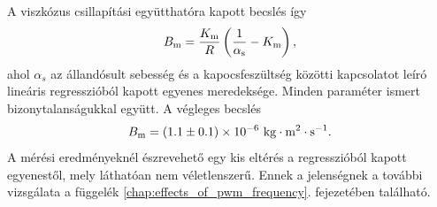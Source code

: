 A viszkózus csillapítási együtthatóra kapott becslés így
\begin{equation}
    B_{\mathrm{m}} = \frac{K_{\mathrm{m}}}{R}\left(\frac{1}{\alpha_{\mathrm{s}}} - K_{\mathrm{m}}\right),
\end{equation}
ahol \(\alpha_s\) az állandósult sebesség és a kapocsfeszültség közötti kapcsolatot 
leíró lineáris regresszióból kapott egyenes meredeksége. Minden paraméter ismert bizonytalanságukkal 
együtt. A végleges becslés
\begin{equation}
    B_{\mathrm{m}} = (1.1 \pm 0.1)\times 10^{-6}~\mathrm{kg\cdot m^2\cdot s^{-1}}.
\end{equation}
A mérési eredményeknél észrevehető egy kis eltérés a regresszióból kapott egyenestől, mely láthatóan nem 
véletlenszerű. Ennek a jelenségnek a további vizsgálata a függelék \ref{chap:effects_of_pwm_frequency}. 
fejezetében található. 

